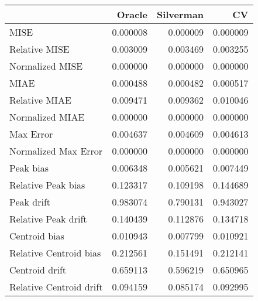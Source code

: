 \begin{tabular}{lrrr}
  \hline
 & Oracle & Silverman & CV \\ 
  \hline
MISE & 0.000008 & 0.000009 & 0.000009 \\ 
  Relative MISE & 0.003009 & 0.003469 & 0.003255 \\ 
  Normalized MISE & 0.000000 & 0.000000 & 0.000000 \\ 
  MIAE & 0.000488 & 0.000482 & 0.000517 \\ 
  Relative MIAE & 0.009471 & 0.009362 & 0.010046 \\ 
  Normalized MIAE & 0.000000 & 0.000000 & 0.000000 \\ 
  Max Error & 0.004637 & 0.004609 & 0.004613 \\ 
  Normalized Max Error & 0.000000 & 0.000000 & 0.000000 \\ 
  Peak bias & 0.006348 & 0.005621 & 0.007449 \\ 
  Relative Peak bias & 0.123317 & 0.109198 & 0.144689 \\ 
  Peak drift & 0.983074 & 0.790131 & 0.943027 \\ 
  Relative Peak drift & 0.140439 & 0.112876 & 0.134718 \\ 
  Centroid bias & 0.010943 & 0.007799 & 0.010921 \\ 
  Relative Centroid bias & 0.212561 & 0.151491 & 0.212141 \\ 
  Centroid drift & 0.659113 & 0.596219 & 0.650965 \\ 
  Relative Centroid drift & 0.094159 & 0.085174 & 0.092995 \\ 
   \hline
\end{tabular}
